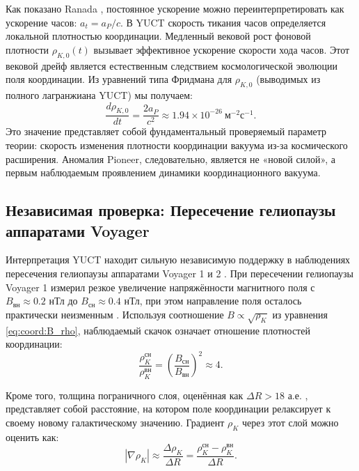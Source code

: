 \documentclass[12pt,a4paper]{article}
\theoremstyle{remark}
\begin{document}
	Как показано Ranada \cite{Ranada2005}, постоянное ускорение можно переинтерпретировать как ускорение часов: $a_t = a_P / c$. В YUCT скорость тикания часов определяется локальной плотностью координации. Медленный вековой рост фоновой плотности $\rho_{K,0}(t)$ вызывает эффективное ускорение скорости хода часов. Этот вековой дрейф является естественным следствием космологической эволюции поля координации. Из уравнений типа Фридмана для $\rho_{K,0}$ (выводимых из полного лагранжиана YUCT) мы получаем:
	\begin{equation}
		\frac{d\rho_{K,0}}{dt} = \frac{2a_P}{c^2} \approx 1.94 \times 10^{-26}\ \text{м}^{-2}\text{с}^{-1}.
		\label{eq:coord:rho_dot}
	\end{equation}
	Это значение представляет собой фундаментальный проверяемый параметр теории: скорость изменения плотности координации вакуума из-за космического расширения. Аномалия Pioneer, следовательно, является не «новой силой», а первым наблюдаемым проявлением динамики координационного вакуума.
	
	\subsection{Независимая проверка: Пересечение гелиопаузы аппаратами Voyager}
	\label{subsec:coord:voyager}
	
	Интерпретация YUCT находит сильную независимую поддержку в наблюдениях пересечения гелиопаузы аппаратами Voyager 1 и 2 \cite{Burlaga2013}. При пересечении гелиопаузы Voyager 1 измерил резкое увеличение напряжённости магнитного поля с $B_{\text{вн}} \approx 0.2$ нТл до $B_{\text{сн}} \approx 0.4$ нТл, при этом направление поля осталось практически неизменным \cite{Burlaga2013}. Используя соотношение $B \propto \sqrt{\rho_K}$ из уравнения \eqref{eq:coord:B_rho}, наблюдаемый скачок означает отношение плотностей координации:
	\begin{equation}
		\frac{\rho_K^{\text{сн}}}{\rho_K^{\text{вн}}} = \left( \frac{B_{\text{сн}}}{B_{\text{вн}}} \right)^2 \approx 4.
		\label{eq:coord:rho_ratio_voyager}
	\end{equation}
	
	Кроме того, толщина пограничного слоя, оценённая как $\Delta R > 18$ а.е. \cite{Richardson2024}, представляет собой расстояние, на котором поле координации релаксирует к своему новому галактическому значению. Градиент $\rho_K$ через этот слой можно оценить как:
	\begin{equation}
		|\nabla \rho_K| \approx \frac{\Delta \rho_K}{\Delta R} = \frac{\rho_K^{\text{сн}} - \rho_K^{\text{вн}}}{\Delta R}.
		\label{eq:coord:gradient_estimate}
	\end{equation}
	
\end{document}
